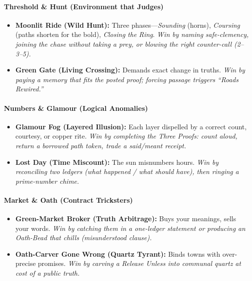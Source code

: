 \paragraph{Threshold \& Hunt (Environment that Judges)}
\begin{itemize}
  \item \textbf{Moonlit Ride (Wild Hunt):} Three phases—\emph{Sounding} (horns), \emph{Coursing} (paths shorten for the bold), \emph{Closing the Ring}. \emph{Win by naming safe-clemency, joining the chase without taking a prey, or blowing the right counter-call (2--3--5).}
  \item \textbf{Green Gate (Living Crossing):} Demands exact change in truths. \emph{Win by paying a memory that fits the posted proof; forcing passage triggers ``Roads Rewired.''}
\end{itemize}

\paragraph{Numbers \& Glamour (Logical Anomalies)}
\begin{itemize}
  \item \textbf{Glamour Fog (Layered Illusion):} Each layer dispelled by a correct count, courtesy, or copper rite. \emph{Win by completing the \textit{Three Proofs}: count aloud, return a borrowed path token, trade a said/meant receipt.}
  \item \textbf{Lost Day (Time Miscount):} The sun misnumbers hours. \emph{Win by reconciling two ledgers (what happened / what should have), then ringing a prime-number chime.}
\end{itemize}

\paragraph{Market \& Oath (Contract Tricksters)}
\begin{itemize}
  \item \textbf{Green-Market Broker (Truth Arbitrage):} Buys your meanings, sells your words. \emph{Win by catching them in a one-ledger statement or producing an Oath-Bead that chills (misunderstood clause).}
  \item \textbf{Oath-Carver Gone Wrong (Quartz Tyrant):} Binds towns with over-precise promises. \emph{Win by carving a \emph{Release Unless} into communal quartz at cost of a public truth.}
\end{itemize}

